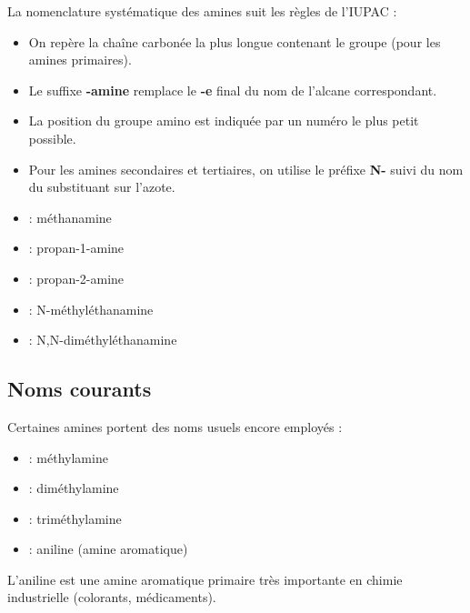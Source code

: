 La nomenclature systématique des amines suit les règles de l'IUPAC :

\begin{loi}
\begin{itemize}
    \item On repère la chaîne carbonée la plus longue contenant le groupe  (pour les amines primaires).
    \item Le suffixe \textbf{-amine} remplace le \textbf{-e} final du nom de l'alcane correspondant.
    \item La position du groupe amino est indiquée par un numéro le plus petit possible.
    \item Pour les amines secondaires et tertiaires, on utilise le préfixe \textbf{N-} suivi du nom du substituant sur l'azote.
\end{itemize}
\end{loi}

\begin{exemple}
\begin{itemize}
    \item {} : méthanamine
    \item {} : propan-1-amine
    \item {} : propan-2-amine
    \item {} : N-méthyléthanamine
    \item {} : N,N-diméthyléthanamine
\end{itemize}
\end{exemple}

\subsection{Noms courants}

Certaines amines portent des noms usuels encore employés :

\begin{itemize}
    \item {} : méthylamine
    \item {} : diméthylamine
    \item {} : triméthylamine
    \item {} : aniline (amine aromatique)
\end{itemize}

\begin{remarque}
L'aniline  est une amine aromatique primaire très importante en chimie industrielle (colorants, médicaments).
\end{remarque}

